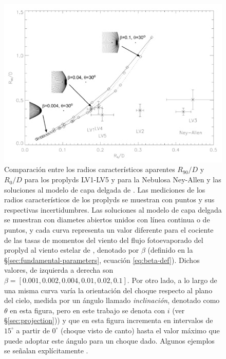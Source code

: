 \begin{figure}
  \centering
  \includegraphics[width=0.9\linewidth]{./Figures/robberto}
  \caption[Comparación entre $R_{90}/D$ y $R_0/D$ por \citet{Robberto:2005}]{Comparación entre los radios característicos aparentes $R_{90}/D$ y $R_0/D$ para los proplyds LV1-LV5 y para la Nebulosa Ney-Allen y las soluciones al modelo de capa delgada de \citep{Canto:1996}. Las mediciones de los radios característicos de los proplyds se muestran con puntos y sus respectivas incertidumbres. Las soluciones al modelo de capa delgada se muestran con diametes abiertos unidos con línea continua o de puntos, y cada curva representa un valor diferente para el cociente de las tasas de momentos del viento del flujo fotoevaporado del proplyd al viento estelar de \thC{}, denotado por $\beta$ (definido en la \S \ref{sec:fundamental-parameters}, ecuación \ref{eq:beta-def}). Dichos valores, de izquierda a derecha son $\beta=[0.001, 0.002, 0.004, 0.01, 0.02, 0.1]$. Por otro lado, a lo largo de una misma curva varía la orientación del choque respecto al plano del cielo, medida por un ángulo llamado \textit{inclinación}, denotado como $\theta$ en esta figura, pero en este trabajo se denota con $i$ (ver \S \ref{sec:projection})) y que en esta figura incrementa en intervalos de $15^\circ$ a partir de $0^\circ$ (choque visto de canto) hasta el valor máximo que puede adoptar este ángulo para un choque dado. Algunos ejemplos se señalan explícitamente \citep{Robberto:2005}.}
  \label{fig:Robberto}
\end{figure}

